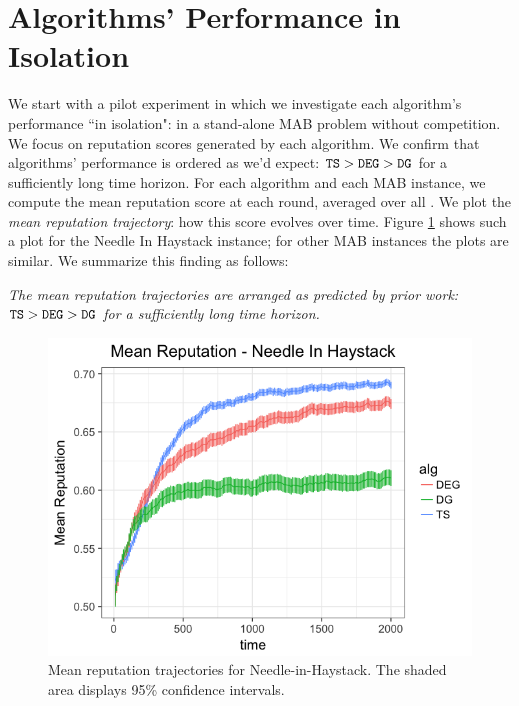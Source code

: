 \documentclass[../competing_bandits.tex]{subfiles}
\begin{document}
\section{Algorithms' Performance in Isolation}\label{sec:isolation}

We start with a pilot experiment in which we investigate each algorithm's performance ``in isolation": in a stand-alone MAB problem without competition. We focus on reputation scores generated by each algorithm. We confirm that algorithms' performance is ordered as we'd expect:
    $\mathtt{TS} > \mathtt{DEG} > \mathtt{DG}$
for a sufficiently long time horizon.
For each algorithm and each MAB instance, we compute the mean reputation score at each round, averaged over all \MRVs. We plot the \emph{mean reputation trajectory}: how this score evolves over time. Figure \ref{prelim_means} shows such a plot for the Needle In Haystack instance; for other MAB instances the plots are similar. We summarize this finding as follows:

\begin{finding}
\textit{The mean reputation trajectories are arranged as predicted by prior work:
    $\mathtt{TS} > \mathtt{DEG} > \mathtt{DG}$ for a sufficiently long time horizon.}
\end{finding}


\begin{figure}
\includegraphics[scale=0.35]{figures/nih_iso_mean}
\caption{Mean reputation trajectories for Needle-in-Haystack. The shaded area displays 95\% confidence intervals.}
\label{prelim_means}
\end{figure}
\end{document}
